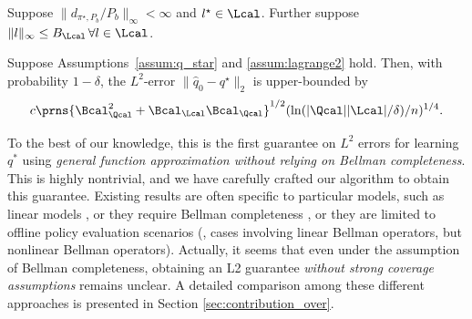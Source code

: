 \begin{assum}\label{assum:lagrange2}
Suppose  $\|d_{\pi^{\star},{P_b}}/P_b\|_{\infty}<\infty$ and $l^{\star} \in \Lcal$. Further suppose $\|l\|_{\infty}\leq B_{\Lcal}\,\forall l\in \Lcal$. 
\end{assum}


\begin{theorem}\label{thm:convergence_q}
Suppose Assumptions~\ref{assum:q_star} and \ref{assum:lagrange2} hold. Then, with probability $1-\delta$, the $L^2$-error $\|\hat q_{0}-q^{\star}\|_2$ is upper-bounded by $$
 c\prns{  \Bcal^2_{\Qcal}+  \Bcal_{\Lcal}\Bcal_{\Qcal}}^{1/2} (\ln(|\Qcal||\Lcal|/\delta)/n)^{1/4}.$$
\end{theorem}

{\finaledit To the best of our knowledge, this is the first guarantee on $L^2$ errors for learning $q^*$ using \emph{general function approximation without relying on Bellman completeness}. This is highly nontrivial, and we have carefully crafted our algorithm to obtain this guarantee. Existing results are often specific to particular models, such as linear models \citep{shi2022statistical}, or they require Bellman completeness \citep{chen2019information,chen2022well}, or they are limited to offline policy evaluation scenarios \citep{huang2022beyond} (\ie, cases involving linear Bellman operators, but nonlinear Bellman operators). Actually, it seems that even under the assumption of Bellman completeness, obtaining an L2 guarantee \emph{without strong coverage assumptions} remains unclear. A detailed comparison among these different approaches is presented in Section \ref{sec:contribution_over}.
} 
